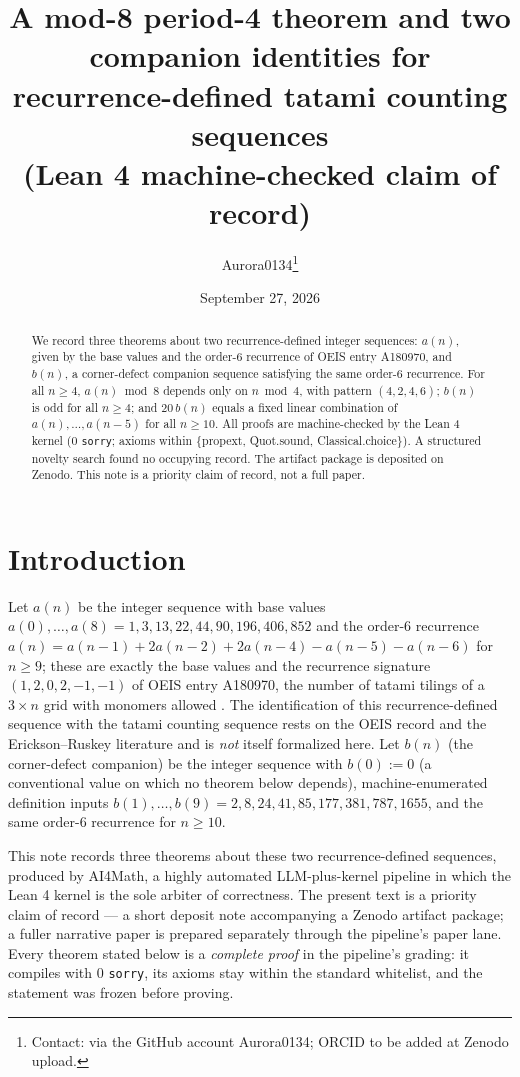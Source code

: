 \documentclass[11pt]{article}
\title{A mod-8 period-4 theorem and two companion identities for
recurrence-defined tatami counting sequences\\
(Lean 4 machine-checked claim of record)}
\author{Aurora0134\thanks{Contact: via the GitHub account Aurora0134; ORCID to
be added at Zenodo upload.}}
\date{September 27, 2026}
\begin{document}
\maketitle

\begin{abstract}
We record three theorems about two recurrence-defined integer sequences:
$a(n)$, given by the base values and the order-6 recurrence of OEIS entry
A180970, and $b(n)$, a corner-defect companion sequence satisfying the same
order-6 recurrence. For all $n \geq 4$, $a(n) \bmod 8$ depends only on
$n \bmod 4$, with pattern $(4,2,4,6)$; $b(n)$ is odd for all $n \geq 4$; and
$20\,b(n)$ equals a fixed linear combination of $a(n), \dots, a(n-5)$ for all
$n \geq 10$. All proofs are machine-checked by the Lean 4 kernel (0
\texttt{sorry}; axioms within \{propext, Quot.sound, Classical.choice\}). A
structured novelty search found no occupying record. The artifact package is
deposited on Zenodo. This note is a priority claim of record, not a full
paper.
\end{abstract}

\section{Introduction}

Let $a(n)$ be the integer sequence with base values
$a(0), \dots, a(8) = 1, 3, 13, 22, 44, 90, 196, 406, 852$ and the order-6
recurrence $a(n) = a(n-1) + 2a(n-2) + 2a(n-4) - a(n-5) - a(n-6)$ for
$n \geq 9$; these are exactly the base values and the recurrence signature
$(1,2,0,2,-1,-1)$ of OEIS entry A180970, the number of tatami tilings of a
$3 \times n$ grid with monomers allowed \cite{oeis-a180970}. The
identification of this recurrence-defined sequence with the tatami counting
sequence rests on the OEIS record and the Erickson--Ruskey literature
\cite{auspicious,ejc-monodimer,square-tatami} and is \emph{not} itself
formalized here. Let $b(n)$ (the corner-defect companion) be the integer
sequence with $b(0) := 0$ (a conventional value on which no theorem below
depends), machine-enumerated definition inputs
$b(1), \dots, b(9) = 2, 8, 24, 41, 85, 177, 381, 787, 1655$, and the same
order-6 recurrence for $n \geq 10$.

This note records three theorems about these two recurrence-defined
sequences, produced by AI4Math, a highly automated LLM-plus-kernel pipeline
in which the Lean 4 kernel is the sole arbiter of correctness. The present
text is a priority claim of record --- a short deposit note accompanying a
Zenodo artifact package; a fuller narrative paper is prepared separately
through the pipeline's paper lane. Every theorem stated below is a
\emph{complete proof} in the pipeline's grading: it compiles with 0
\texttt{sorry}, its axioms stay within the standard whitelist, and the
statement was frozen before proving.
\end{document}
